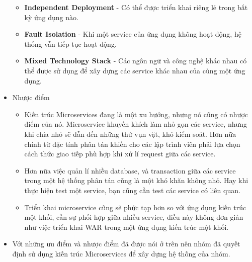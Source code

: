 \begin{itemize}
\begin{itemize}
                \item \textbf{Independent Deployment} - Có thể được triển khai riêng lẻ trong bất kỳ ứng dụng nào.
                \item \textbf{Fault Isolation} - Khi một service của ứng dụng không hoạt động, hệ thống vẫn tiếp tục hoạt động.
                \item \textbf{Mixed Technology Stack} - Các ngôn ngữ và công nghệ khác nhau có thể được sử dụng để xây dựng các service khác nhau của cùng một ứng dụng.
            \end{itemize}
            \item Nhược điểm
            \begin{itemize}
                \item Kiến trúc Microservices đang là một xu hướng, nhưng nó cũng có nhược điểm của nó. Microservice khuyến khích làm nhỏ gọn các service, nhưng khi chia nhỏ sẽ dẫn đến những thứ vụn vặt, khó kiểm soát. Hơn nữa chính từ đặc tính phân tán khiến cho các lập trình viên phải lựa chọn cách thức giao tiếp phù hợp khi xử lí request giữa các service.
                \item Hơn nữa việc quản lí nhiều database, và transaction giữa các service trong một hệ thống phân tán cũng là một khó khăn không nhỏ. Hay khi thực hiện test một service, bạn cũng cần test các service có liên quan.
                \item Triển khai microservice cũng sẽ phức tạp hơn so với ứng dụng kiến trúc một khối, cần sự phối hợp giữa nhiều service, điều này không đơn giản như việc triển khai WAR trong một ứng dụng kiến trúc một khối.
            \end{itemize}
            \item Với những ưu điểm và nhược điểm đã được nói ở trên nên nhóm đã quyết định sử dụng kiến trúc Microservices để xây dựng hệ thống của nhóm.
        \end{itemize}
